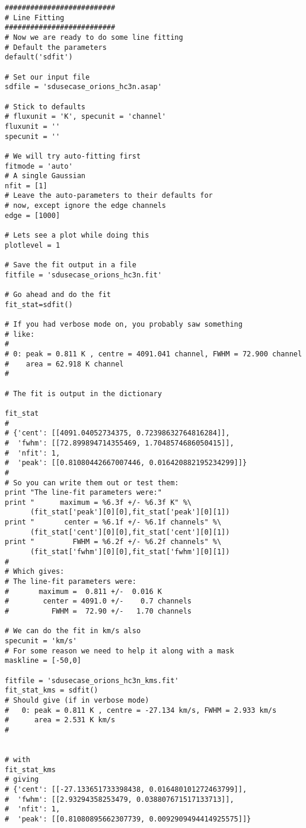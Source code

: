 \begin{verbatim}
##########################
# Line Fitting
##########################
# Now we are ready to do some line fitting
# Default the parameters
default('sdfit')

# Set our input file
sdfile = 'sdusecase_orions_hc3n.asap'

# Stick to defaults
# fluxunit = 'K', specunit = 'channel'
fluxunit = ''
specunit = ''

# We will try auto-fitting first
fitmode = 'auto'
# A single Gaussian
nfit = [1]
# Leave the auto-parameters to their defaults for
# now, except ignore the edge channels
edge = [1000]

# Lets see a plot while doing this
plotlevel = 1

# Save the fit output in a file
fitfile = 'sdusecase_orions_hc3n.fit'

# Go ahead and do the fit
fit_stat=sdfit()

# If you had verbose mode on, you probably saw something
# like:
#
# 0: peak = 0.811 K , centre = 4091.041 channel, FWHM = 72.900 channel
#    area = 62.918 K channel
#

# The fit is output in the dictionary

fit_stat
#
# {'cent': [[4091.04052734375, 0.72398632764816284]],
#  'fwhm': [[72.899894714355469, 1.7048574686050415]],
#  'nfit': 1,
#  'peak': [[0.81080442667007446, 0.016420882195234299]]}
#
# So you can write them out or test them:
print "The line-fit parameters were:"
print "      maximum = %6.3f +/- %6.3f K" %\
      (fit_stat['peak'][0][0],fit_stat['peak'][0][1])
print "       center = %6.1f +/- %6.1f channels" %\
      (fit_stat['cent'][0][0],fit_stat['cent'][0][1])
print "         FWHM = %6.2f +/- %6.2f channels" %\
      (fit_stat['fwhm'][0][0],fit_stat['fwhm'][0][1])
#
# Which gives:
# The line-fit parameters were:
#       maximum =  0.811 +/-  0.016 K
#        center = 4091.0 +/-    0.7 channels
#          FWHM =  72.90 +/-   1.70 channels

# We can do the fit in km/s also
specunit = 'km/s'
# For some reason we need to help it along with a mask
maskline = [-50,0]

fitfile = 'sdusecase_orions_hc3n_kms.fit'
fit_stat_kms = sdfit()
# Should give (if in verbose mode)
#   0: peak = 0.811 K , centre = -27.134 km/s, FWHM = 2.933 km/s
#      area = 2.531 K km/s
#


# with
fit_stat_kms
# giving
# {'cent': [[-27.133651733398438, 0.016480101272463799]],
#  'fwhm': [[2.93294358253479, 0.038807671517133713]],
#  'nfit': 1,
#  'peak': [[0.81080895662307739, 0.0092909494414925575]]}



\end{verbatim}
